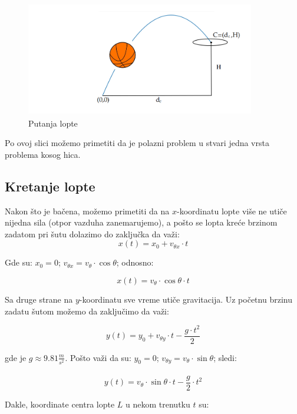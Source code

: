 \documentclass[a4paper, 12pt]{article}
\begin{document}
\begin{figure}[h]
\hspace*{0.9cm}
\includegraphics[width=10cm, height=5cm]{pic1}
\caption{Putanja lopte}
\end{figure}

Po ovoj slici možemo primetiti da je polazni problem u stvari jedna vrsta problema kosog hica.



\subsection{Kretanje lopte}

Nakon što je bačena, možemo primetiti da na $x$-koordinatu lopte više ne utiče nijedna sila (otpor vazduha zanemarujemo), a pošto se lopta kreće brzinom zadatom pri šutu dolazimo do zaključka da važi:\\


\[x(t) = x_0 + v_{\theta x}\cdot t\]


Gde su: $x_0 = 0$; $v_{\theta x} = v_\theta \cdot \cos \theta$; odnosno:

\begin{equation}
x(t) = v_\theta \cdot \cos \theta \cdot t
\end{equation}

Sa druge strane na $y$-koordinatu sve vreme utiče gravitacija. Uz početnu brzinu zadatu šutom možemo da zaključimo da važi:

\[y(t) = y_0 + v_{\theta y} \cdot t - \dfrac{g \cdot t^2}{2}\]

gde je $g \approx 9.81\dfrac{_m}{^{s^2}}$. Pošto važi da su: $y_0 = 0$; $v_{\theta y} = v_\theta \cdot \sin \theta$; sledi:

\begin{equation}
y(t) = v_\theta \cdot \sin \theta\cdot t - \dfrac{g}{2} \cdot t^2
\end{equation}

Dakle, koordinate centra lopte $L$ u nekom trenutku $t$ su:
\end{document}
